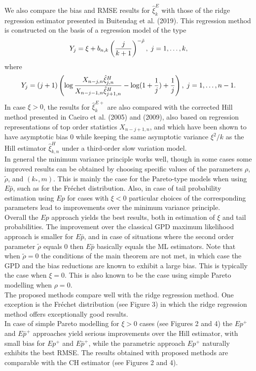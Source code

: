 \documentclass[twoside,leqno,11pt]{article}
\begin{document}
\noindent
We also compare the bias and RMSE results for $\hat{\xi}_k^{E}$ with those of  the ridge regression estimator presented in Buitendag et al. (2019). This regression method is constructed on the basis of a regression model of the type
$$
Y_j = \xi + b_{n,k}\left( {j \over k+1} \right)^{-\tilde\rho}, \; j=1,\ldots,k,
$$
where 
$$
Y_j= (j+1) \left(\log \frac{X_{n-j,n}\hat{\xi}^H_{j,n}}{X_{n-j-1,n}\hat{\xi}^H_{j+1,n}} - \log (1+{1 \over j}) + {1 \over j} \right), \; j=1,\ldots,n-1.
$$
In case $\xi >0$, the results for $\hat{\xi}_k^{E+}$ are also compared with the corrected Hill method presented in Caeiro et al. (2005) and (2009), also based on regression representations of top order statistics $X_{n-j+1,n}$, and which have been shown
to have asymptotic bias 0 while keeping the same asymptotic variance $\xi^2/k$ as the Hill estimator $\hat{\xi}^H_{k,n}$ under a third-order slow variation model. \\ 

\noindent
In general the minimum variance principle works well, though in some cases some improved results can be obtained by choosing specific values of the parameters $\rho$, $\tilde\rho$, and $(k_*,m)$. This is mainly the case for the Pareto-type models when using $E\bar{p}$, such as for the Fr\'echet distribution. Also, in case of tail probability estimation using $Ep$ for cases with $\xi <0$ particular choices of the corresponding parameters lead to improvements over the minimum variance principle.
\\
Overall the $Ep$ approach yields the best results, both in estimation of $\xi$ and tail probabilities. The improvement over the classical GPD maximum likelihood approach is smaller for $E\bar{p}$, and in case of situations where the second order parameter $\tilde\rho$ equals 0 then $E\bar{p}$ basically equals the ML estimators. Note that when $\tilde\rho=0$ the conditions of the main theorem are not met, in which case the GPD and the bias reductions are known to exhibit a large bias. This is typically the case when $\xi=0$. This is also known to be the case using simple Pareto modelling when $\rho=0$. \\
The proposed methods compare well with the ridge regression method. One exception is the Fr\'echet distribution (see Figure 3) in which the ridge regression method offers exceptionally good results.
\\

\noindent
In case of simple Pareto modelling for $\xi >0$ cases (see Figures 2 and 4) the $Ep^+$ and $E\bar{p}^+$  approaches yield serious improvements over the Hill estimator, with small bias for $Ep^+$ and $E\bar{p}^+$, while the parametric approach $Ep^+$ naturally exhibits the best RMSE. The results obtained with  proposed methods are comparable with the CH estimator (see Figures 2 and 4). \\
 
\end{document}
